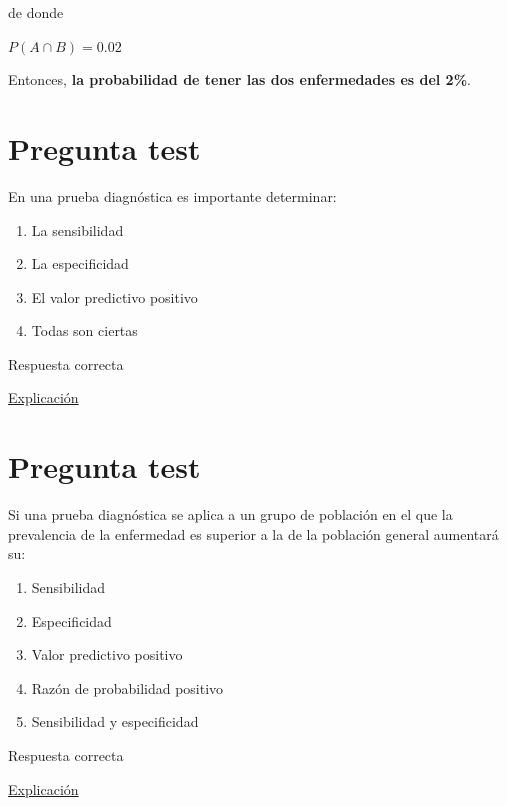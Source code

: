 \documentclass[
]{book}
\providecommand{\tightlist}{%
  \setlength{\itemsep}{0pt}\setlength{\parskip}{0pt}}
\begin{document}
de donde

\(P(A \cap B)=0.02\)

Entonces, \textbf{la probabilidad de tener las dos enfermedades es del 2\%}.

\hypertarget{pregunta-test-143}{%
\section{Pregunta test}\label{pregunta-test-143}}

En una prueba diagnóstica es importante determinar:

\begin{enumerate}
\def\labelenumi{\alph{enumi})}
\tightlist
\item
  La sensibilidad
\item
  La especificidad
\item
  El valor predictivo positivo
\item
  Todas son ciertas
\end{enumerate}

Respuesta correcta

\href{https://1fjmanzano.github.io/bioestadistica/relaci\%C3\%B3n-entre-variables-cualitativas.html\#diagno\%CC\%81stico-cli\%CC\%81nico}{Explicación}

\hypertarget{pregunta-test-144}{%
\section{Pregunta test}\label{pregunta-test-144}}

Si una prueba diagnóstica se aplica a un grupo de población en el que la prevalencia de la enfermedad es superior a la de la población general aumentará su:

\begin{enumerate}
\def\labelenumi{\alph{enumi})}
\tightlist
\item
  Sensibilidad
\item
  Especificidad
\item
  Valor predictivo positivo
\item
  Razón de probabilidad positivo
\item
  Sensibilidad y especificidad
\end{enumerate}

Respuesta correcta

\href{https://1fjmanzano.github.io/bioestadistica/relaci\%C3\%B3n-entre-variables-cualitativas.html\#diagno\%CC\%81stico-cli\%CC\%81nico}{Explicación}
\end{document}

